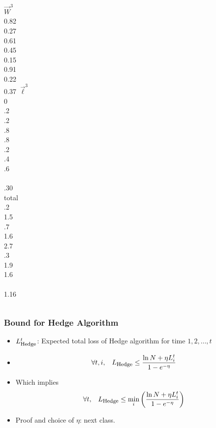 \documentclass[handout]{beamer}
\newcommand{\W}{\vec{W}}
\newcommand{\loss}{\vec{\ell}}
\newcommand{\HedgeLoss}{L_{\mbox{\footnotesize Hedge}}}
\begin{document}
\begin{frame}
\begin{columns}
\column[t]{1cm}
  $\W^3$ \\0.82\\ 0.27\\0.61\\0.45\\0.15\\ 0.91\\0.22 \\ 0.37 
\column[t]{1cm}
$\loss^3$ \\ 0 \\ .2 \\ .2  \\ .8 \\ .8 \\  .2 \\  .4  \\ .6 \\ ~ \\
\color<11>{red} .30 \\

\column[t]{2cm}
 total\\ .2 \\ 1.5 \\ .7  \\ 1.6 \\ 2.7 \\ .3 \\ 1.9  \\ 1.6 \\ ~ \\
 1.16 \\

\end{columns} 
\end{frame} 

\begin{frame}
\frametitle{Bound for Hedge Algorithm}
\begin{itemize}
\item
$\HedgeLoss^t$: Expected total loss of Hedge algorithm for time $1,2,\ldots,t$ 
\item
\[
\forall t,i, \;\;\;
\HedgeLoss \leq \frac{\ln N + \eta L_i^t}{1-e^{-\eta}}
\]
\item Which implies
\[
\forall t, \;\;\;
\HedgeLoss \leq \min_i \left( \frac{\ln N + \eta L_i^t}{1-e^{-\eta}} \right)
\]
\item
Proof and choice of $\eta$: next class.
\end{itemize}
\end{frame}
\end{document}
